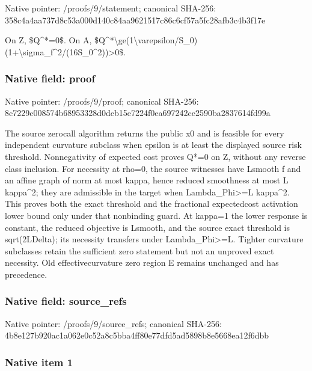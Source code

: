 \documentclass[10pt,a4paper]{article}
\begin{document}
Native pointer: /proofs/9/statement; canonical SHA-256: 358c4a4aa737d8c53a000d14\allowbreak{}0c84aa9621517c86c6cf57a5\allowbreak{}fc28afb3c4b3f17e


On Z, \$Q\textasciicircum{}*=0\$. On A, \$Q\textasciicircum{}*\textbackslash{}ge(1\textbackslash{}varepsilon/S\_\allowbreak{}0)(1+\textbackslash{}sigma\_f\textasciicircum{}2/(16S\_0\textasciicircum{}2\allowbreak{}))>0\$.


\subsubsection{Native field: proof}


Native pointer: /proofs/9/proof; canonical SHA-256: 8c7229c008574b68953328d0\allowbreak{}dcb15e7224f0ea697242ce25\allowbreak{}90ba2837614fd99a


The source zerocall algorithm returns the public x0 and is feasible for every independent curvature subclass when epsilon is at least the displayed source risk threshold. Nonnegativity of expected cost proves Q*=0 on Z, without any reverse class inclusion. For necessity at rho=0, the source witnesses have Lsmooth f and an affine graph of norm at most kappa, hence reduced smoothness at most L kappa\textasciicircum{}2; they are admissible in the target when Lambda\_Phi>=L kappa\textasciicircum{}2. This proves both the exact threshold and the fractional expectedcost activation lower bound only under that nonbinding guard. At kappa=1 the lower response is constant, the reduced objective is Lsmooth, and the source exact threshold is sqrt(2LDelta); its necessity transfers under Lambda\_Phi>=L. Tighter curvature subclasses retain the sufficient zero statement but not an unproved exact necessity. Old effectivecurvature zero region E remains unchanged and has precedence.


\subsubsection{Native field: source\_refs}


Native pointer: /proofs/9/source\_refs; canonical SHA-256: 4b8e127b920ac1a062e0c52a\allowbreak{}8c5bba4ff80e77dfd5ad5898\allowbreak{}b8e5668ea12f6dbb



\subsubsection{Native item 1}
\end{document}
